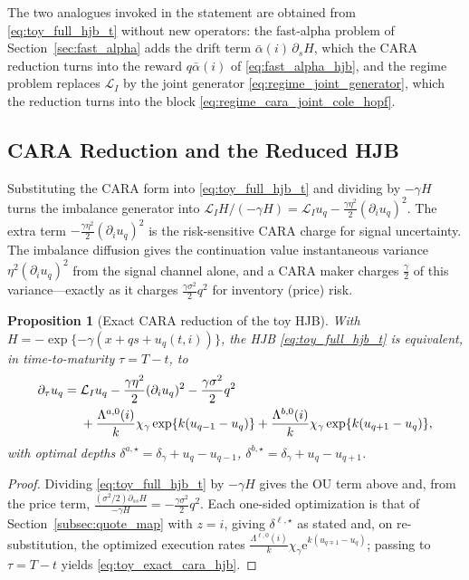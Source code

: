 \documentclass[11pt,a4paper]{article}
\newcommand{\Lcal}{\mathcal{L}}
\newcommand{\e}{\mathrm e}
\newcommand{\alphabar}{\bar\alpha}
\theoremstyle{plain}
\newtheorem{proposition}{Proposition}[section]
\theoremstyle{definition}
\begin{document}
The two analogues invoked in the statement are obtained from
\eqref{eq:toy_full_hjb_t} without new operators: the fast-alpha problem of
Section~\ref{sec:fast_alpha} adds the drift term \(\alphabar(i)\,\partial_sH\),
which the CARA reduction turns into the reward \(q\alphabar(i)\) of
\eqref{eq:fast_alpha_hjb}, and the regime problem replaces \(\Lcal_I\) by the
joint generator \eqref{eq:regime_joint_generator}, which the reduction turns
into the block \eqref{eq:regime_cara_joint_cole_hopf}.

\subsection{CARA Reduction and the Reduced HJB}

Substituting the CARA form into \eqref{eq:toy_full_hjb_t} and dividing by
\(-\gamma H\) turns the imbalance generator into
\(\Lcal_IH/(-\gamma H)=\Lcal_Iu_q-\tfrac{\gamma\eta^2}{2}(\partial_i u_q)^2\).
The extra term \(-\tfrac{\gamma\eta^2}{2}(\partial_i u_q)^2\) is the
risk-sensitive CARA charge for signal uncertainty.  The imbalance diffusion
gives the continuation value instantaneous variance \(\eta^2(\partial_i u_q)^2\)
from the signal channel alone, and a CARA maker charges \(\tfrac\gamma2\) of this
variance---exactly as it charges \(\tfrac{\gamma\sigma^2}{2}q^2\) for inventory
(price) risk.

\begin{proposition}[Exact CARA reduction of the toy HJB]
\label{prop:toy_reduction}
With \(H=-\exp\{-\gamma(x+qs+u_q(t,i))\}\), the HJB \eqref{eq:toy_full_hjb_t} is
equivalent, in time-to-maturity \(\tau=T-t\), to
\begin{align}
\partial_\tau u_q
={}&
\Lcal_I u_q-\frac{\gamma\eta^2}{2}(\partial_i u_q)^2-\frac{\gamma\sigma^2}{2}q^2
\notag\\
&+\frac{\Lambda^{a,0}(i)}{k}\chi_\gamma\exp\{k(u_{q-1}-u_q)\}
+\frac{\Lambda^{b,0}(i)}{k}\chi_\gamma\exp\{k(u_{q+1}-u_q)\},
\label{eq:toy_exact_cara_hjb}
\end{align}
with optimal depths \(\delta^{a,\star}=\delta_\gamma+u_q-u_{q-1}\),
\(\delta^{b,\star}=\delta_\gamma+u_q-u_{q+1}\).
\end{proposition}

\begin{proof}
Dividing \eqref{eq:toy_full_hjb_t} by \(-\gamma H\) gives the OU term above and,
from the price term, \(\tfrac{(\sigma^2/2)\partial_{ss}H}{-\gamma H}=-\tfrac{\gamma\sigma^2}{2}q^2\).
Each one-sided optimization is that of Section~\ref{subsec:quote_map} with
\(z=i\), giving \(\delta^{\ell,\star}\) as stated and, on re-substitution, the
optimized execution rates
\(\tfrac{\Lambda^{\ell,0}(i)}{k}\chi_\gamma\e^{k(u_{q\mp1}-u_q)}\); passing to
\(\tau=T-t\) yields \eqref{eq:toy_exact_cara_hjb}.
\end{proof}
\end{document}

